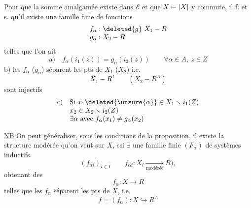 Pour que la somme amalgamée existe dans  $\mathcal E$ et que $X\mathrel{\mapstochar\relbar}|X|$ y commute, il f. et s. qu'il existe une famille finie de  fonctions
\[
\begin{array}{l}
f_\alpha:\deleted{g}\ X_1\mathbin{-}R\\
g_\alpha:X_2\mathbin{-}R
\end{array}
\]
telles que l'on ait
\[
\text{a)}\quad f_\alpha(i_1(z))=g_\alpha(i_2(z))\qquad\forall\alpha\in A,\ z\in Z
\]
b)  les $f_\alpha$ ($g_\alpha$) séparent les pts de $X_1$ ($X_2$) i.e.
\[
 X_1\mathbin{-}R^I\qquad(X_2\mathbin{-}R^A)
\]
sont injectifs
\[
\begin{array}{ll}
\text{c)}&\text{Si }x_1\deleted{\unsure{\alpha}}\in X_1\smallsetminus i_1(Z)\\
&x_2\in X_2\smallsetminus i_2(Z)\\
&\exists\alpha\text{ avec }f_\alpha(x_1)\ne g_\alpha(x_2)
\end{array}
\]

\uline{NB} On peut généraliser, sous les conditions de la proposition, il existe la structure modérée qu'on veut sur $X$, ssi $\exists$ une famille finie $(F_\alpha)$  de systèmes inductifs
\[
 (f_{\alpha i})_{i\in I}\qquad f_{\alpha i}:X_i\underset{\text{modérée}}{\longrightarrow}R),
\]
obtenant des
\[
 f_\alpha:X\longrightarrow R
\]
telles que les $f_\alpha$ séparent les pts de $X$, i.e.
\[
 f=(f_\alpha):X\hookrightarrow R^A
\]
